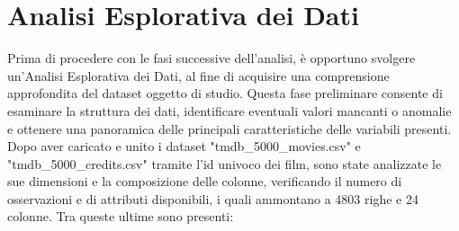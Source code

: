 \documentclass{article}
\begin{document}
\section{Analisi Esplorativa dei Dati}
Prima di procedere con le fasi successive dell'analisi, \`e opportuno svolgere un'Analisi Esplorativa dei Dati, al fine di acquisire una comprensione approfondita del dataset oggetto di studio. Questa fase preliminare consente di esaminare la struttura dei dati, identificare eventuali valori mancanti o anomalie e ottenere una panoramica delle principali caratteristiche delle variabili presenti.\\
Dopo aver caricato e unito i dataset "tmdb\_5000\_movies.csv" e "tmdb\_5000\_credits.csv" tramite l'id univoco dei film, sono state analizzate le sue dimensioni e la composizione delle colonne, verificando il numero di osservazioni e di attributi disponibili, i quali ammontano a 4803 righe e 24 colonne. Tra queste ultime sono presenti:
\end{document}
